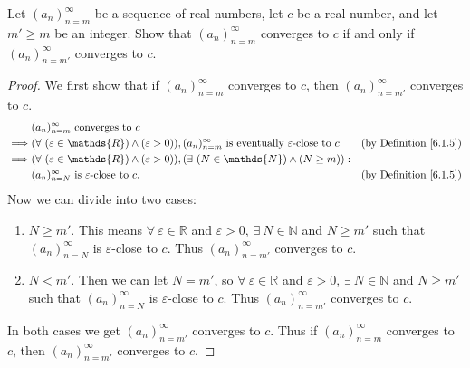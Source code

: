 \begin{exercise}\label{ex 6.1.3}
Let \((a_n)_{n = m}^\infty\) be a sequence of real numbers, let \(c\) be a real number, and let \(m' \geq m\) be an integer.
Show that \((a_n)_{n = m}^\infty\) converges to \(c\) if and only if \((a_n)_{n = m'}^\infty\) converges to \(c\).
\end{exercise}

\begin{proof}
We first show that if \((a_n)_{n = m}^\infty\) converges to \(c\), then \((a_n)_{n = m'}^\infty\) converges to \(c\).
\begin{align*}
& (a_n)_{n = m}^\infty \text{ converges to } c \\
\implies & (\forall\ (\varepsilon \in \mathds{R}) \land (\varepsilon > 0)), (a_n)_{n = m}^\infty \text{ is eventually } \varepsilon\text{-close to } c & \text{(by Definition \ref{6.1.5})} \\
\implies & (\forall\ (\varepsilon \in \mathds{R}) \land (\varepsilon > 0)), (\exists\ (N \in \mathds{N}) \land (N \geq m)) : \\
& (a_n)_{n = N}^\infty \text{ is } \varepsilon\text{-close to } c. & \text{(by Definition \ref{6.1.5})}
\end{align*}
Now we can divide into two cases:
\begin{enumerate}
    \item \(N \geq m'\).
    This means \(\forall\ \varepsilon \in \mathds{R}\) and \(\varepsilon > 0\), \(\exists\ N \in \mathds{N}\) and \(N \geq m'\) such that \((a_n)_{n = N}^\infty\) is \(\varepsilon\)-close to \(c\).
    Thus \((a_n)_{n = m'}^\infty\) converges to \(c\).
    \item \(N < m'\).
    Then we can let \(N = m'\), so \(\forall\ \varepsilon \in \mathds{R}\) and \(\varepsilon > 0\), \(\exists\ N \in \mathds{N}\) and \(N \geq m'\) such that \((a_n)_{n = N}^\infty\) is \(\varepsilon\)-close to \(c\).
    Thus \((a_n)_{n = m'}^\infty\) converges to \(c\).
\end{enumerate}
In both cases we get \((a_n)_{n = m'}^\infty\) converges to \(c\).
Thus if \((a_n)_{n = m}^\infty\) converges to \(c\), then \((a_n)_{n = m'}^\infty\) converges to \(c\).


\end{proof}
